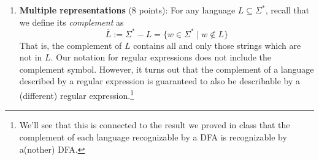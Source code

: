 \begin{enumerate}[wide, labelwidth=!, labelindent=0pt]
\begin{enumerate}
Recall the definitions we have: 
For each language $L$ over the alphabet $\Sigma_1 = \{0,1\}$, we have the 
associated set of strings
  $$EXTEND(L) = \{ w \in \Sigma_1^* ~|~ w = uv \text{ for some strings } u \in L \text{ and } v \in \Sigma_1^* \}$$
We will prove that the collection of languages over $\{0,1\}$ that are each 
recognizable by some NFA is closed under the $EXTEND$ operation.

\begin{enumerate}
 
   \item \gradeComplete As a helpful tool in our construction\footnote{A result that is proved in 
   order to work towards a larger theorem is called a Lemma.}, prove that every NFA can be 
   converted to an equivalent one that has a single accept state. Note: this is exercise 1.11 in 
   the textbook.

   \item \gradeCorrect Prove that the collection of languages over $\{0,1\}$ that are each 
   recognizable by some NFA is closed under the $EXTEND$ operation. You can assume 
   that you are given a NFA with a single accept state $N = (Q, \{0,1\}, \delta, q_0, \{q_{acc}\})$
   and you need to define a new NFA, $N_{new} = (Q_{new}, \{0,1\}, \delta_{new}, q_{new}, F_{new})$,
    so that $L(N_{new}) = EXTEND(L(N))$. 

    A complete solution will include precise definitions for $Q_{new}, \delta_{new}, q_{new},$ and 
    $F_{new}$, as well as a 
    a brief justification 
    of your construction by explaining why these definitions work, referring 
    specifically to the definition of $EXTEND$ and to acceptance of NFA.

\end{enumerate}

\end{enumerate}
\item\textbf{Multiple representations} (8 points):
For any language $L \subseteq \Sigma^*$, recall that we define its \emph{complement} as 
$$\overline{L} := \Sigma^* - L = \{w \in \Sigma^* \mid w \notin L\}$$ That is, the complement of $L$ 
contains all and only those strings which are not in $L$. Our notation for regular expressions does not 
include the complement symbol. However, 
it turns out that the complement of a language described by a regular expression is guaranteed to also be describable by a 
(different) regular expression.\footnote{We'll see that this is connected to the 
result we proved in class that the complement of each language recognizable by a DFA is 
recognizable by a(nother) DFA.}


\end{enumerate}
